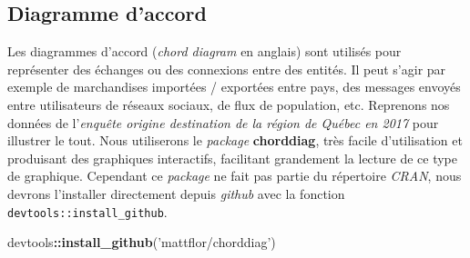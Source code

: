 \documentclass[
  11pt,
  french,
]{book}
\makeatletter
\newenvironment{Shaded}{\begin{snugshade}}{\end{snugshade}}
\newcommand{\KeywordTok}[1]{\textcolor[rgb]{0.13,0.29,0.53}{\textbf{#1}}}
\newcommand{\NormalTok}[1]{#1}
\newcommand{\OperatorTok}[1]{\textcolor[rgb]{0.81,0.36,0.00}{\textbf{#1}}}
\newcommand{\StringTok}[1]{\textcolor[rgb]{0.31,0.60,0.02}{#1}}
\newenvironment{kframe}{%
\medskip{}
\setlength{\fboxsep}{.8em}
 \def\at@end@of@kframe{}%
 \ifinner\ifhmode%
  \def\at@end@of@kframe{\end{minipage}}%
  \begin{minipage}{\columnwidth}%
 \fi\fi%
 \def\FrameCommand##1{\hskip\@totalleftmargin \hskip-\fboxsep
 \colorbox{shadecolor}{##1}\hskip-\fboxsep
     \hskip-\linewidth \hskip-\@totalleftmargin \hskip\columnwidth}%
 \MakeFramed {\advance\hsize-\width
   \@totalleftmargin\z@ \linewidth\hsize
   \@setminipage}}%
 {\par\unskip\endMakeFramed%
 \at@end@of@kframe}
\renewenvironment{Shaded}{\begin{kframe}}{\end{kframe}}
\makeatother
\begin{document}
\hypertarget{sect0332}{%
\subsection{Diagramme d'accord}\label{sect0332}}

Les diagrammes d'accord (\emph{chord diagram} en anglais) sont utilisés pour représenter des échanges ou des connexions entre des entités. Il peut s'agir par exemple de marchandises importées / exportées entre pays, des messages envoyés entre utilisateurs de réseaux sociaux, de flux de population, etc. Reprenons nos données de l'\emph{enquête origine destination de la région de Québec en 2017} pour illustrer le tout. Nous utiliserons le \emph{package} \textbf{chorddiag}, très facile d'utilisation et produisant des graphiques interactifs, facilitant grandement la lecture de ce type de graphique. Cependant ce \emph{package} ne fait pas partie du répertoire \emph{CRAN}, nous devrons l'installer directement depuis \emph{github} avec la fonction \texttt{devtools::install\_github}.

\begin{Shaded}
\begin{Highlighting}[]
\NormalTok{devtools}\OperatorTok{::}\KeywordTok{install_github}\NormalTok{(}\StringTok{'mattflor/chorddiag'}\NormalTok{)}
\end{Highlighting}
\end{Shaded}
\end{document}
